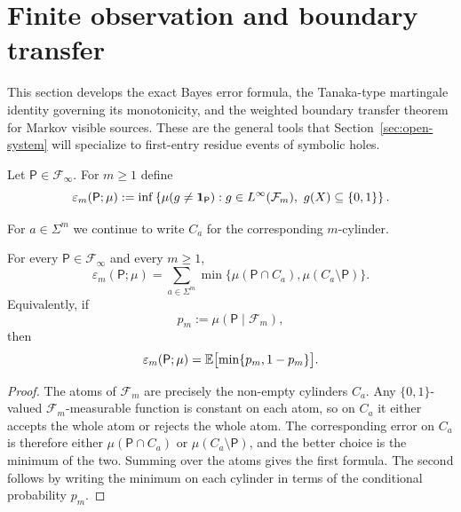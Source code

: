 \section{Finite observation and boundary transfer}\label{sec:clarity}

This section develops the exact Bayes error formula, the Tanaka-type
martingale identity governing its monotonicity, and the weighted
boundary transfer theorem for Markov visible sources.  These are the
general tools that Section~\ref{sec:open-system} will specialize to
first-entry residue events of symbolic holes.

\begin{definition}
\label{def:scan-error}\label{def:scan-error-profile}
Let \(\mathsf{P}\in\mathcal{F}_\infty\).  For \(m\geq 1\) define
\[
  \varepsilon_m(\mathsf{P};\mu)
  := \inf\left\{
      \mu(g\neq \mathbf{1}_{\mathsf{P}}):
      g\in L^\infty(\mathcal{F}_m),\ g(X)\subseteq\{0,1\}
     \right\}.
\]
\end{definition}

For \(a\in\Sigma^m\) we continue to write \(C_a\) for the corresponding
\(m\)-cylinder.

\begin{proposition}
\label{prop:scan-error-cylinder}
For every \(\mathsf{P}\in\mathcal{F}_\infty\) and every \(m\geq 1\),
\[
  \varepsilon_m(\mathsf{P};\mu)
  = \sum_{a\in\Sigma^m}
      \min\bigl\{\mu(\mathsf{P}\cap C_a),
                 \mu(C_a\setminus\mathsf{P})\bigr\}.
\]
Equivalently, if
\[
  p_m := \mu(\mathsf{P}\mid \mathcal{F}_m),
\]
then
\[
  \varepsilon_m(\mathsf{P};\mu)
  = \mathbb{E}\bigl[\min\{p_m,1-p_m\}\bigr].
\]
\end{proposition}

\begin{proof}
The atoms of \(\mathcal{F}_m\) are precisely the non-empty cylinders
\(C_a\).  Any \(\{0,1\}\)-valued \(\mathcal{F}_m\)-measurable function is
constant on each atom, so on \(C_a\) it either accepts the whole atom or
rejects the whole atom.  The corresponding error on \(C_a\) is
therefore either \(\mu(\mathsf{P}\cap C_a)\) or
\(\mu(C_a\setminus\mathsf{P})\), and the better choice is the minimum of
the two.  Summing over the atoms gives the first formula.  The second
follows by writing the minimum on each cylinder in terms of the
conditional probability \(p_m\).
\end{proof}

